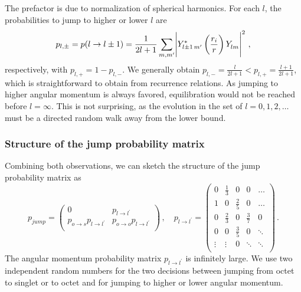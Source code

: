 \documentclass[times,sort&compress,final]{elsarticle}
\newcommand{\redflag}[1]{{\color{red} #1}}
\begin{document}
The prefactor is due to normalization of spherical harmonics. 
For each $l$, the probabilities to jump to higher or lower $l$ are 
\begin{align}
p_{l,\pm} = p(l \to l \pm 1) =\frac{1}{2l+1}\sum_{m,m'} \abs{ Y_{l\pm 1\,m^\prime}^\ast \left(\frac{r_i}{r}\right) Y_{lm}^{\phantom{\ast}} }^2\,,
\label{eq:Pl+-}
\end{align}respectively, with $p_{l,+}=1-p_{l,-}$. 
We generally obtain $p_{l,-}=\frac{l}{2l+1} < p_{l,+}=\frac{l+1}{2l+1}$, which is straightforward to obtain from recurrence relations. 
As jumping to higher angular momentum is always favored, 
equilibration would not be reached before $l=\infty$. 
This is not surprising, as the evolution in the set of $l=0,1,2,\ldots$ must be a directed random walk 
away from the lower bound.

\subsubsection{Structure of the jump probability matrix}

Combining both observations, we can sketch the structure of the jump probability matrix as 
\begin{equation}
p_{jump}=\left(\begin{array}{cc}
0                         &         p_{l\to l^\prime} \\
p_{o \to s} p_{l\to l^\prime} & p_{o \to o} p_{l\to l^\prime} \\
\end{array}\right)\,,
\quad
p_{l\to l^\prime} =\left(\begin{array}{ccccc}
0           & \frac{1}{3} & 0           & 0           & \hdots\\
1 & 0           & \frac{2}{5} & 0           & \hdots \\
0           & \frac{2}{3} & 0           & \frac{3}{7} & 0\\
0           & 0           & \frac{3}{5} & 0           & \ddots\\
\vdots      & \vdots      & 0           & \ddots      & \ddots \\
\end{array}\right)\,.
\label{eq:pjump}
\end{equation}
The angular momentum probability matrix $p_{l\to l^\prime}$ is infinitely large. 
We use two independent random numbers for the two decisions between jumping from octet to singlet or to octet 
and for jumping to higher or lower angular momentum.
\end{document}
